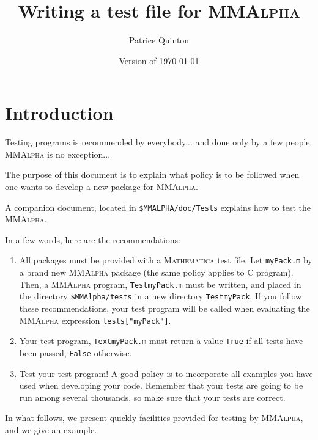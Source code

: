 \documentclass[12pt]{article}
\begin{document}
\newcommand{\domlib}{{\sc domlib}}
\newcommand{\ML}{{\sc Mathlink}}
\newcommand{\mprep}{{\sc mprep}}
\newcommand{\polylib}{{\sc polylib}}
\newcommand{\mma}{{\sc Mathematica}}
\newcommand{\mkf}{{\texttt Makefile}}
\newcommand{\gcc}{\texttt{gcc}}
\newcommand{\doml}{\texttt{domlib.c}}
\newcommand{\tm}{\texttt{domlibtm.c}}
\newcommand{\mmAlpha}{\textsc{MMAlpha}}
\newcommand{\MMAlpha}{\textsc{MMAlpha}}
\newcommand{\MMA}{\textsc{Mathematica}}
\newcommand{\true}{\texttt{True}}
\newcommand{\false}{\texttt{False}}

\title{Writing a test file for \mmAlpha{}}
\author{Patrice Quinton}
\date{Version of \today}
\maketitle

\section{Introduction}
Testing programs is recommended by everybody... and done only
by a few people. \mmAlpha{} is no exception...

The purpose of this document is to explain what policy
is to be followed when one wants to develop a new package for
\mmAlpha{}.

A companion document, located in \texttt{\$MMALPHA/doc/Tests}
explains how to test the \mmAlpha{}. 

In a few words, here are the recommendations:
\begin{enumerate}
\item All packages must be provided with a \MMA{} test file. 
Let \texttt{myPack.m} by a brand new \MMAlpha{} package (the
same policy applies to C program). Then, a \MMAlpha{} program, 
\texttt{TestmyPack.m} must be written, and placed in the 
directory \texttt{\$MMAlpha/tests} in a 
new directory \texttt{TestmyPack}. If you follow these
recommendations, your test program will be called when evaluating
the \MMAlpha{} expression \texttt{tests["myPack"]}. 
\item Your test program, \texttt{TextmyPack.m} must 
return a value \true{} if all tests
have been passed, \false{} otherwise. 
\item Test your test program! A good policy is to incorporate
all examples you have used when developing your code. 
Remember that your tests are going to be run among 
several thousands, so make sure that your tests are 
correct.
\end{enumerate}
In what follows, we present quickly facilities provided
for testing by \MMAlpha{}, and we give an example. 
\end{document}
